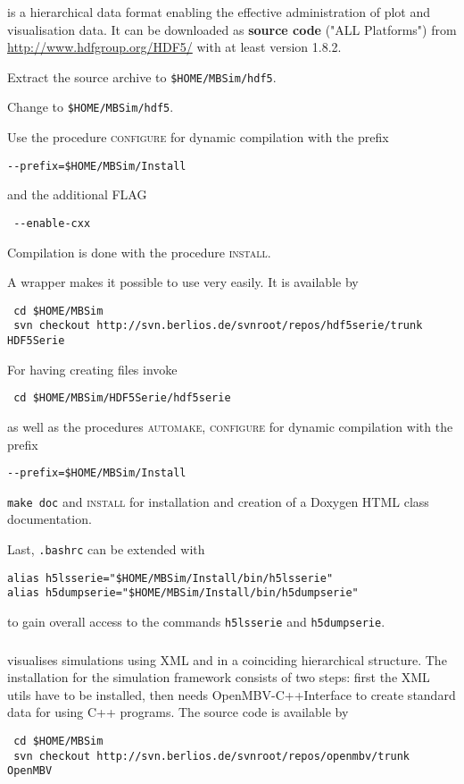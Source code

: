 \subsubsection{\HDF}
\HDF{} is a hierarchical data format enabling the effective administration of plot and visualisation data. It can be downloaded as \textbf{source code} ("ALL Platforms") 
from \url{http://www.hdfgroup.org/HDF5/} with at least version 1.8.2.\par
Extract the source archive to \texttt{\$HOME/MBSim/hdf5}.\par
Change to \texttt{\$HOME/MBSim/hdf5}.\par
Use the procedure \textsc{configure} for dynamic compilation with the prefix
\begin{verbatim}
--prefix=$HOME/MBSim/Install
\end{verbatim}
and the additional FLAG
\begin{verbatim}
 --enable-cxx
\end{verbatim}
Compilation is done with the procedure \textsc{install}.\par
A \HDF{} wrapper makes it possible to use \HDF{} very easily. It is available by
\begin{verbatim}
 cd $HOME/MBSim
 svn checkout http://svn.berlios.de/svnroot/repos/hdf5serie/trunk HDF5Serie
\end{verbatim}
For having \MBSim{} creating \HDF{} files invoke
\begin{verbatim}
 cd $HOME/MBSim/HDF5Serie/hdf5serie
\end{verbatim}
as well as the procedures \textsc{automake, configure} for dynamic compilation with the prefix
\begin{verbatim}
--prefix=$HOME/MBSim/Install
\end{verbatim}
\texttt{make doc} and \textsc{install} for installation and creation of a Doxygen HTML class documentation.\par
Last, \texttt{.bashrc} can be extended with
\begin{verbatim}
alias h5lsserie="$HOME/MBSim/Install/bin/h5lsserie"
alias h5dumpserie="$HOME/MBSim/Install/bin/h5dumpserie"
\end{verbatim}
to gain overall access to the commands \texttt{h5lsserie} and \texttt{h5dumpserie}.

\subsubsection{\OpenMBV{}}
\OpenMBV{} visualises \MBSim{} simulations using XML and \HDF{} in a coinciding hierarchical structure. The installation for the simulation framework consists of two steps: first the XML utils have to be installed, then \MBSim{} needs \textsf{OpenMBV-C++Interface} to create standard data for \OpenMBV{} using C++ programs. The source code is available by
\begin{verbatim}
 cd $HOME/MBSim
 svn checkout http://svn.berlios.de/svnroot/repos/openmbv/trunk OpenMBV
\end{verbatim}

